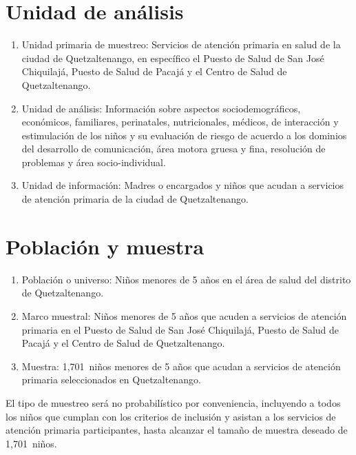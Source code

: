 \documentclass[11pt,letterpaper]{report}
\newcommand{\tiempito}{durante mayo de 2025}
\newcommand{\muestradeseada}{1,701}
\begin{document}
\section{Unidad de análisis}
	\begin{enumerate}
		\item Unidad primaria de muestreo: Servicios de atención primaria en
		salud de la ciudad de Quetzaltenango, en específico el Puesto de
		Salud de San José Chiquilajá, Puesto de Salud de Pacajá y el Centro de
		Salud de Quetzaltenango.
		\item Unidad de análisis: Información sobre aspectos sociodemográficos,
		económicos, familiares, perinatales, nutricionales, médicos, de
		interacción y estimulación de los niños y su evaluación de riesgo de
		acuerdo a los dominios del desarrollo de comunicación, área motora
		gruesa y fina, resolución de problemas y área socio-individual.
		\item Unidad de información: Madres o encargados y niños que acudan a
		servicios de atención primaria de la ciudad de Quetzaltenango.
	\end{enumerate}

\section{Población y muestra}
	\begin{enumerate}
		\item Población o universo: Niños menores de 5 años en el área de salud
		del distrito de Quetzaltenango.
		\item Marco muestral: Niños menores de 5 años que acuden a servicios de
		atención primaria en el Puesto de Salud de San José Chiquilajá, Puesto
		de Salud de Pacajá y el Centro de Salud de Quetzaltenango. %
		\item Muestra: \muestradeseada\ niños menores de 5 años que acudan a
		servicios de atención primaria seleccionados en Quetzaltenango.
	\end{enumerate}

El tipo de muestreo será no probabilístico por conveniencia, incluyendo a todos
los niños que cumplan con los criterios de inclusión y asistan a los servicios
de atención primaria participantes, hasta alcanzar el tamaño
de muestra deseado de \muestradeseada\ niños.
\end{document}
